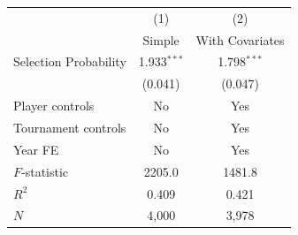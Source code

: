 \begin{tabular}{lcc}
\toprule
 & (1) & (2) \\
 & Simple & With Covariates \\
\midrule
Selection Probability & 1.933$^{***}$ & 1.798$^{***}$ \\
 & (0.041) & (0.047) \\
\midrule
Player controls & No & Yes \\
Tournament controls & No & Yes \\
Year FE & No & Yes \\
\midrule
$F$-statistic & 2205.0 & 1481.8 \\
$R^2$ & 0.409 & 0.421 \\
$N$ & 4,000 & 3,978 \\
\bottomrule
\end{tabular}
